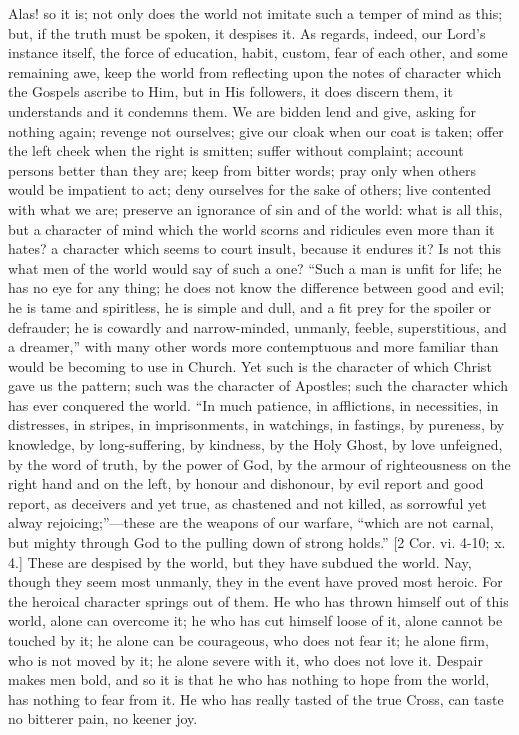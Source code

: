 Alas! so it is; not only does the world not imitate such a temper
of mind as this; but, if the truth must be spoken, it despises it. As
regards, indeed, our Lord's instance itself, the force of education,
habit, custom, fear of each other, and some remaining awe, keep the
world from reflecting upon the notes of character which the Gospels
ascribe to Him, but in His followers, it does discern them, it
understands and it condemns them. We are bidden lend and give, asking
for nothing again; revenge not ourselves; give our cloak when our coat
is taken; offer the left cheek when the right is smitten; suffer
without complaint; account persons better than they are; keep from
bitter words; pray only when others would be impatient to act; deny
ourselves for the sake of others; live contented with what we are;
preserve an ignorance of sin and of the world: what is all this, but a
character of mind which the world scorns and ridicules even more than
it hates? a character which seems to court insult, because it endures
it? Is not this what men of the world would say of such a one?
``Such a man is unfit for life; he has no eye for any thing; he
does not know the difference between good and evil; he is tame and
spiritless, he is simple and dull, and a fit prey for the spoiler or
defrauder; he is cowardly and narrow-minded, unmanly, feeble,
superstitious, and a dreamer,'' with many other words more
contemptuous and more familiar than would be becoming to use in
Church. Yet such is the character of which Christ gave us the pattern;
such was the character of Apostles; such the character which has ever
conquered the world. ``In much patience, in afflictions, in
necessities, in distresses, in stripes, in imprisonments, in watchings,
in fastings, by pureness, by knowledge, by long-suffering, by
kindness, by the Holy Ghost, by love unfeigned, by the word of truth,
by the power of God, by the armour of righteousness on the right hand
and on the left, by honour and dishonour, by evil report and good
report, as deceivers and yet true, as chastened and not killed, as
sorrowful yet alway rejoicing;''—these are the weapons of our
warfare, ``which are not carnal, but mighty through God to the
pulling down of strong holds.'' [2 Cor. vi. 4-10; x. 4.] These are
despised by the world, but they have subdued the world. Nay, though
they seem most unmanly, they in the event have proved most heroic. For
the heroical character springs out of them. He who has thrown himself
out of this world, alone can overcome it; he who has cut himself loose
of it, alone cannot be touched by it; he alone can be courageous, who
does not fear it; he alone firm, who is not moved by it; he alone
severe with it, who does not love it. Despair makes men bold, and so
it is that he who has nothing to hope from the world, has nothing to
fear from it. He who has really tasted of the true Cross, can taste no
bitterer pain, no keener joy.

